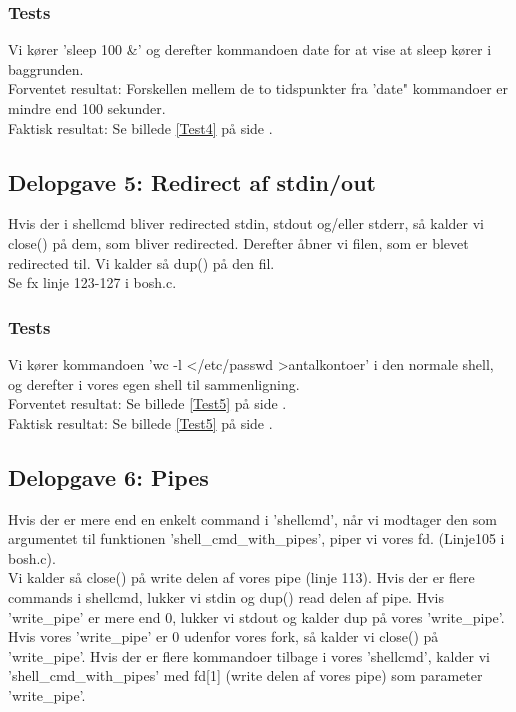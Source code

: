 \subsubsection{Tests}
Vi kører 'sleep 100 \&' og derefter kommandoen date for at vise at sleep kører i baggrunden.
\\Forventet resultat: Forskellen mellem de to tidspunkter fra 'date" kommandoer er mindre end 100 sekunder.
\\Faktisk resultat: Se billede \ref{Test4} på side \pageref{Test4}.

\subsection{Delopgave 5: Redirect af stdin/out}
\label{D5}
Hvis der i shellcmd bliver redirected stdin, stdout og/eller stderr, så kalder vi close() på dem, som bliver redirected. Derefter åbner vi filen, som er blevet redirected til. Vi kalder så dup() på den fil.
\\Se fx linje 123-127  i bosh.c.
\subsubsection{Tests}
Vi kører kommandoen 'wc -l \textless /etc/passwd \textgreater antalkontoer' i den normale shell, og derefter i vores egen shell til sammenligning.
\\Forventet resultat: Se billede \ref{Test5} på side \pageref{Test5}.
\\Faktisk resultat: Se billede \ref{Test5} på side \pageref{Test5}.
 
\subsection{Delopgave 6: Pipes}
\label{D6}
Hvis der er mere end en enkelt command i 'shellcmd', når vi modtager den som argumentet til funktionen 'shell\_cmd\_with\_pipes', piper vi vores fd. (Linje105 i bosh.c).
\\Vi kalder så close() på write delen af vores pipe (linje 113). Hvis der er flere commands i shellcmd, lukker vi stdin og dup() read delen af pipe. Hvis 'write\_pipe' er mere end 0, lukker vi stdout og kalder dup på vores 'write\_pipe'.
\\Hvis vores 'write\_pipe' er 0 udenfor vores fork, så kalder vi close() på 'write\_pipe'. Hvis der er flere kommandoer tilbage i vores 'shellcmd', kalder vi 'shell\_cmd\_with\_pipes' med fd[1] (write delen af vores pipe) som parameter 'write\_pipe'.
